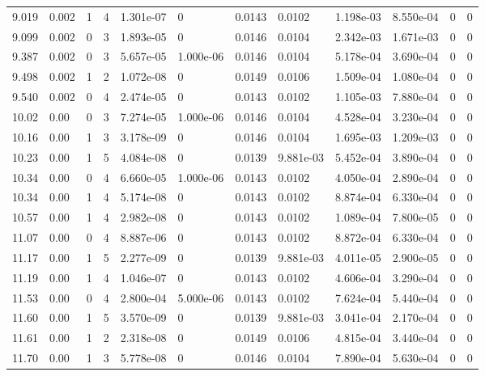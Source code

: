 \documentclass[preview]{standalone}
\begin{document}
{{{\begin{tabular}{L{1.2cm}C{1.2cm} C{0.3cm}C{0.5cm} C{1.4cm}C{1.4cm} C{1.4cm}C{1.4cm} C{1.6cm}C{1.6cm} C{1.6cm}C{1.6cm}}
  9.019  &  0.002  & 1     &  4 &  1.301e-07  & 0  &  0.0143&   0.0102& 1.198e-03 & 8.550e-04   &  0 & 0  \\ 
  9.099  &  0.002  & 0     &  3 &  1.893e-05  & 0  &  0.0146&   0.0104& 2.342e-03 & 1.671e-03   &  0 & 0  \\ 
  9.387  &  0.002  & 0     &  3 &  5.657e-05  & 1.000e-06  &  0.0146&   0.0104& 5.178e-04 & 3.690e-04   &  0 & 0  \\ 
  9.498  &  0.002  & 1     &  2 &  1.072e-08  & 0  &  0.0149&   0.0106& 1.509e-04 & 1.080e-04   &  0 & 0  \\ 
  9.540  &  0.002  & 0     &  4 &  2.474e-05  & 0  &  0.0143&   0.0102& 1.105e-03 & 7.880e-04   &  0 & 0  \\ 
  10.02  &  0.00  & 0     &  3 &  7.274e-05  & 1.000e-06  &  0.0146&   0.0104& 4.528e-04 & 3.230e-04   &  0 & 0  \\ 
  10.16  &  0.00  & 1     &  3 &  3.178e-09  & 0  &  0.0146&   0.0104& 1.695e-03 & 1.209e-03   &  0 & 0  \\ 
  10.23  &  0.00  & 1     &  5 &  4.084e-08  & 0  &  0.0139&   9.881e-03& 5.452e-04 & 3.890e-04   &  0 & 0  \\ 
  10.34  &  0.00  & 0     &  4 &  6.660e-05  & 1.000e-06  &  0.0143&   0.0102& 4.050e-04 & 2.890e-04   &  0 & 0  \\ 
  10.34  &  0.00  & 1     &  4 &  5.174e-08  & 0  &  0.0143&   0.0102& 8.874e-04 & 6.330e-04   &  0 & 0  \\ 
  10.57  &  0.00  & 1     &  4 &  2.982e-08  & 0  &  0.0143&   0.0102& 1.089e-04 & 7.800e-05   &  0 & 0  \\ 
  11.07  &  0.00  & 0     &  4 &  8.887e-06  & 0  &  0.0143&   0.0102& 8.872e-04 & 6.330e-04   &  0 & 0  \\ 
  11.17  &  0.00  & 1     &  5 &  2.277e-09  & 0  &  0.0139&   9.881e-03& 4.011e-05 & 2.900e-05   &  0 & 0  \\ 
  11.19  &  0.00  & 1     &  4 &  1.046e-07  & 0  &  0.0143&   0.0102& 4.606e-04 & 3.290e-04   &  0 & 0  \\ 
  11.53  &  0.00  & 0     &  4 &  2.800e-04  & 5.000e-06  &  0.0143&   0.0102& 7.624e-04 & 5.440e-04   &  0 & 0  \\ 
  11.60  &  0.00  & 1     &  5 &  3.570e-09  & 0  &  0.0139&   9.881e-03& 3.041e-04 & 2.170e-04   &  0 & 0  \\ 
  11.61  &  0.00  & 1     &  2 &  2.318e-08  & 0  &  0.0149&   0.0106& 4.815e-04 & 3.440e-04   &  0 & 0  \\ 
  11.70  &  0.00  & 1     &  3 &  5.778e-08  & 0  &  0.0146&   0.0104& 7.890e-04 & 5.630e-04   &  0 & 0  \\ 

\end{tabular}}}}
\end{document}
